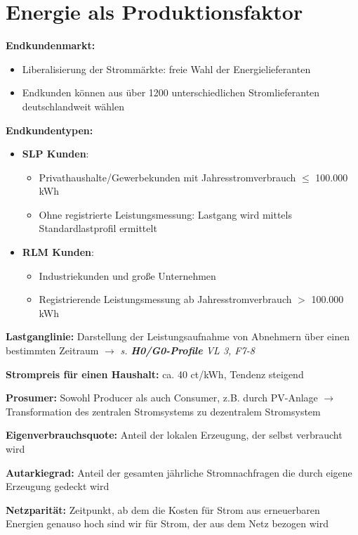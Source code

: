 \section{Energie als Produktionsfaktor}

\textbf{Endkundenmarkt:} 
\begin{itemize}
	\item Liberalisierung der Strommärkte: freie Wahl der Energielieferanten
	\item Endkunden können aus über 1200 unterschiedlichen Stromlieferanten deutschlandweit wählen
\end{itemize}
\bigskip
\textbf{Endkundentypen:}
\begin{itemize}
	\item \textbf{SLP Kunden}:
	\begin{itemize}
		\item Privathaushalte/Gewerbekunden mit Jahresstromverbrauch $\leq$ 100.000 kWh
		\item Ohne registrierte Leistungsmessung: Lastgang wird mittels Standardlastprofil ermittelt
	\end{itemize}
	\pagebreak
	\item \textbf{RLM Kunden}:
	\begin{itemize}
		\item Industriekunden und große Unternehmen
		\item Registrierende Leistungsmessung ab Jahresstromverbrauch $>$ 100.000 kWh
	\end{itemize}
\end{itemize}
\bigskip
\textbf{Lastganglinie:} Darstellung der Leistungsaufnahme von Abnehmern über einen bestimmten Zeitraum $\rightarrow$ \textit{s. \textbf{H0/G0-Profile} VL 3, F7-8}

\textbf{Strompreis für einen Haushalt:} ca. 40 ct/kWh, Tendenz steigend

\textbf{Prosumer:} Sowohl Producer als auch Consumer, z.B. durch PV-Anlage $\rightarrow$ Transformation des zentralen Stromsystems zu dezentralem Stromsystem

\textbf{Eigenverbrauchsquote:} Anteil der lokalen Erzeugung, der selbst verbraucht wird

\textbf{Autarkiegrad:} Anteil der gesamten jährliche Stromnachfragen die durch eigene Erzeugung gedeckt wird

\textbf{Netzparität:} Zeitpunkt, ab dem die Kosten für Strom aus erneuerbaren Energien genauso hoch sind wir für Strom, der aus dem Netz bezogen wird

